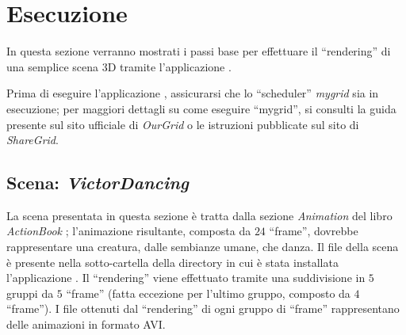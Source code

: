 
\section{Esecuzione} \label{sec:exec}

In questa sezione verranno mostrati i passi base per effettuare il ``rendering'' di una semplice scena 3D tramite l'applicazione \mgTheApp{}.

Prima di eseguire l'applicazione \mgTheApp{}, assicurarsi che lo ``scheduler'' \emph{mygrid} sia in esecuzione; per maggiori dettagli su come eseguire ``mygrid'', si consulti la guida presente sul sito ufficiale di \emph{OurGrid} o le istruzioni pubblicate sul sito di \emph{ShareGrid}.

\subsection{Scena: \emph{VictorDancing}} \label{ssec:exec-victor}

La scena presentata in questa sezione \`e tratta dalla sezione \emph{Animation} del libro \emph{ActionBook} \cite{Krizanovskij2007ActioBook}; l'animazione risultante, composta da $24$ ``frame'', dovrebbe rappresentare una creatura, dalle sembianze umane, che danza.
Il file della scena \`e presente nella sotto-cartella  della directory in cui \`e stata installata l'applicazione \mgTheApp{}.
Il ``rendering'' viene effettuato tramite una suddivisione in $5$ gruppi da $5$ ``frame'' (fatta eccezione per l'ultimo gruppo, composto da $4$ ``frame'').
I file ottenuti dal ``rendering'' di ogni gruppo di ``frame'' rappresentano delle animazioni in formato AVI.

